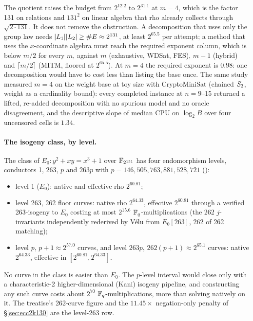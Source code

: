 The quotient raises the budget from $2^{12.2}$ to $2^{31.1}$ at $m=4$, which
is the factor 131 on relations and $131^2$ on linear algebra that rho
already collects through $\sqrt{2\cdot131}$. It does not remove the
obstruction. A decomposition that uses only the group law needs
$\lvert L_1 \rvert\lvert L_2 \rvert\ge\#E\approx2^{131}$, at least $2^{65.5}$ per attempt;
a method that uses the $x$-coordinate algebra must reach the required
exponent column, which is below $m/2$ for every $m$, against $m$
(exhaustive, WDSat, FES), $m-1$ (hybrid) and $\lceil m/2\rceil$ (MITM, floored
at $2^{65.5}$). At $m=4$ the required exponent is $0.98$: one decomposition
would have to cost less than listing the base once. The same study measured
$m=4$ on the weight base at toy size with CryptoMiniSat (chained $S_{3}$,
weight as a cardinality bound): every completed instance at $n=9$--15
returned a lifted, re-added decomposition with no spurious model and no
oracle disagreement, and the descriptive slope of median CPU on $\log_2B$ over
four uncensored cells is $1.34$.

\paragraph{The isogeny class, by level.} The class of
$E_0: y^2+xy=x^3+1$ over $\mathbb{F}_{2^{131}}$ has four endomorphism levels,
conductors 1, 263, $p$ and $263p$ with $p=146{,}505{,}763{,}881{,}528{,}721$
():
\begin{itemize}
\item level 1 ($E_0$): native and effective rho $2^{60.81}$;
\item level 263, 262 floor curves: native rho $2^{64.33}$, effective
  $2^{60.81}$ through a verified 263-isogeny to $E_0$ costing at most
  $2^{15.6}$ $\mathbb{F}_q$-multiplications (the 262 $j$-invariants independently
  rederived by V\'elu from $E_0[263]$, 262 of 262 matching);
\item level $p$, $p+1\approx2^{57.0}$ curves, and level $263p$,
  $262(p+1)\approx2^{65.1}$ curves: native $2^{64.33}$, effective in
  $[2^{60.81},2^{64.33}]$.
\end{itemize}
No curve in the class is easier than $E_0$. The $p$-level interval would
close only with a characteristic-2 higher-dimensional (Kani) isogeny
pipeline, and constructing any such curve costs about $2^{70}$
$\mathbb{F}_q$-multiplications, more than solving natively on it. The treatise's
262-curve figure and the $11.45\times$ negation-only penalty of
\S\ref{sec:ecc2k130} are the level-263 row.

